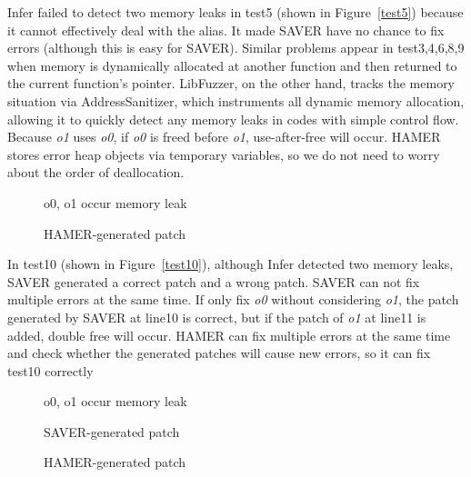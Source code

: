 \documentclass[a4paper,11pt,oneside,openany]{book}
\begin{document}
Infer failed to detect two memory leaks in test5 (shown in Figure~\ref{test5}) because it cannot effectively deal with the alias. It made SAVER have no chance to fix errors (although this is easy for SAVER). Similar problems appear in test3,4,6,8,9 when memory is dynamically allocated at another function and then returned to the current function's pointer. LibFuzzer, on the other hand, tracks the memory situation via AddressSanitizer, which instruments all dynamic memory allocation, allowing it to quickly detect any memory leaks in codes with simple control flow. Because {\it o1} uses {\it o0}, if {\it o0} is freed before {\it o1}, use-after-free will occur. HAMER stores error heap objects via temporary variables, so we do not need to worry about the order of deallocation.

\begin{figure*}[h]
  \begin{subfigure}{0.53\textwidth}
    
    \caption{o0, o1 occur memory leak}
    \label{test5a}
  \end{subfigure}\hfill
  \begin{subfigure}{0.4\textwidth}
    
    \caption{HAMER-generated patch}
    \label{test5b}
  \end{subfigure}
  \caption{test5} 
  \label{test5}
\end{figure*}

In test10 (shown in Figure~\ref{test10}), although Infer detected two memory leaks, SAVER generated a correct patch and a wrong patch. SAVER can not fix multiple errors at the same time. If only fix {\it o0} without considering {\it o1}, the patch generated by SAVER at line10 is correct, but if the patch of {\it o1} at line11 is added, double free will occur. HAMER can fix multiple errors at the same time and check whether the generated patches will cause new errors, so it can fix test10 correctly

\begin{figure*}[t]
  \begin{subfigure}{0.45\textwidth}
    
    \caption{o0, o1 occur memory leak}
    \label{test10a}
  \end{subfigure}\hfill
  \begin{subfigure}{0.45\textwidth}
    
    \caption{SAVER-generated patch}
    \label{test10b}
  \end{subfigure}
  \centering
  \begin{subfigure}{0.45\textwidth}
    
    \caption{HAMER-generated patch}
    \label{test10c}
  \end{subfigure}
  \caption{test10} 
  \label{test10}
\end{figure*}
\end{document}

